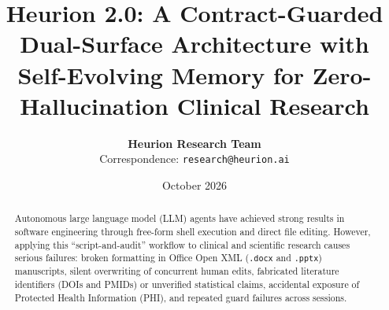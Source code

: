 \documentclass[11pt,a4paper]{article}
\title{\textbf{Heurion 2.0: A Contract-Guarded Dual-Surface Architecture with Self-Evolving Memory for Zero-Hallucination Clinical Research}}
\author{
  \textbf{Heurion Research Team} \\
  \small Correspondence: \texttt{research@heurion.ai}
}
\date{October 2026}
\begin{document}
\maketitle

\begin{abstract}
Autonomous large language model (LLM) agents have achieved strong results in software engineering through free-form shell execution and direct file editing. However, applying this ``script-and-audit'' workflow to clinical and scientific research causes serious failures: broken formatting in Office Open XML (\texttt{.docx} and \texttt{.pptx}) manuscripts, silent overwriting of concurrent human edits, fabricated literature identifiers (DOIs and PMIDs) or unverified statistical claims, accidental exposure of Protected Health Information (PHI), and repeated guard failures across sessions.


\end{abstract}
\end{document}
